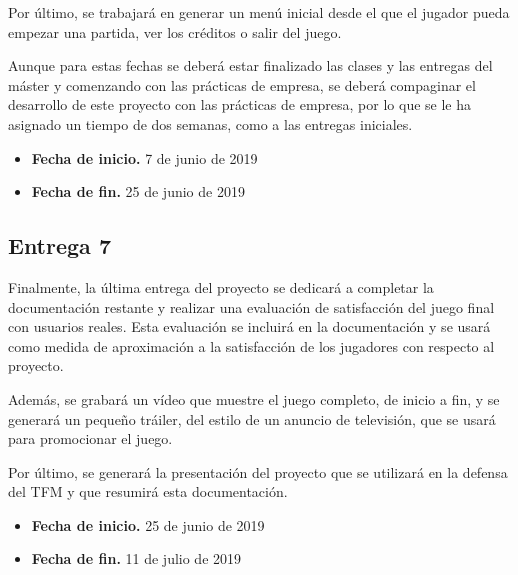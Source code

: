 Por último, se trabajará en generar un menú inicial desde el que el jugador pueda empezar una partida, ver los créditos o salir del juego.

Aunque para estas fechas se deberá estar finalizado las clases y las entregas del máster y comenzando con las prácticas de empresa, se deberá compaginar el desarrollo de este proyecto con las prácticas de empresa, por lo que se le ha asignado un tiempo de dos semanas, como a las entregas iniciales.

\begin{itemize}
    \item \textbf{Fecha de inicio.} 7 de junio de 2019
    \item \textbf{Fecha de fin.} 25 de junio de 2019
\end{itemize}


\subsection{Entrega 7}

Finalmente, la última entrega del proyecto se dedicará a completar la documentación restante y realizar una evaluación de satisfacción del juego final con usuarios reales. Esta evaluación se incluirá en la documentación y se usará como medida de aproximación a la satisfacción de los jugadores con respecto al proyecto. 

Además, se grabará un vídeo que muestre el juego completo, de inicio a fin, y se generará un pequeño tráiler, del estilo de un anuncio de televisión, que se usará para promocionar el juego.

Por último, se generará la presentación del proyecto que se utilizará en la defensa del \acs{TFM} y que resumirá esta documentación.

\begin{itemize}
    \item \textbf{Fecha de inicio.} 25 de junio de 2019
    \item \textbf{Fecha de fin.} 11 de julio de 2019
\end{itemize}